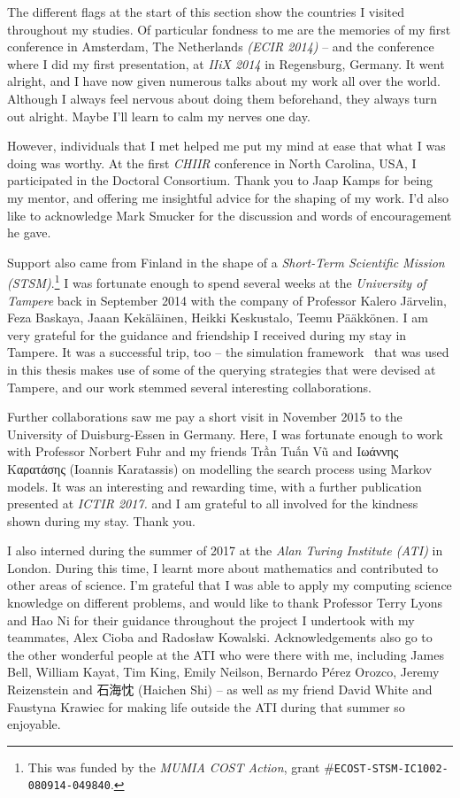 \begin{preamble}
The different flags at the start of this section show the countries I visited throughout my studies. Of particular fondness to me are the memories of my first conference in Amsterdam, The Netherlands \emph{(ECIR 2014)} -- and the conference where I did my first presentation, at \emph{IIiX 2014} in Regensburg, Germany. It went alright, and I have now given numerous talks about my work all over the world. Although I always feel nervous about doing them beforehand, they always turn out alright. Maybe I'll learn to calm my nerves one day.

However, individuals that I met helped me put my mind at ease that what I was doing was worthy. At the first \emph{CHIIR} conference in North Carolina, USA, I participated in the Doctoral Consortium. Thank you to Jaap Kamps for being my mentor, and offering me insightful advice for the shaping of my work. I'd also like to acknowledge Mark Smucker for the discussion and words of encouragement he gave.

Support also came from Finland in the shape of a \emph{Short-Term Scientific Mission (STSM)}.\footnote{This was funded by the \emph{MUMIA COST Action}, grant \#\texttt{ECOST-STSM-IC1002-080914-049840}.} I was fortunate enough to spend several weeks at the \emph{University of Tampere} back in September 2014 with the company of Professor Kalero J\"{a}rvelin, Feza Baskaya, Jaaan Kek\"{a}l\"{a}inen, Heikki Keskustalo, Teemu P\"{a}\"{a}kk\"{o}nen. I am very grateful for the guidance and friendship I received during my stay in Tampere. It was a successful trip, too -- the simulation framework \simiir~that was used in this thesis makes use of some of the querying strategies that were devised at Tampere, and our work stemmed several interesting collaborations.

Further collaborations saw me pay a short visit in November 2015 to the University of Duisburg-Essen in Germany. Here, I was fortunate enough to work with Professor Norbert Fuhr and my friends Trần Tuấn Vũ and Ιωάννης Καρατάσης (Ioannis Karatassis) on modelling the search process using Markov models. It was an interesting and rewarding time, with a further publication presented at \emph{ICTIR 2017.} and I am grateful to all involved for the kindness shown during my stay. Thank you.

I also interned during the summer of 2017 at the \emph{Alan Turing Institute (ATI)} in London. During this time, I learnt more about mathematics and contributed to other areas of science. I'm grateful that I was able to apply my computing science knowledge on different problems, and would like to thank Professor Terry Lyons and Hao Ni for their guidance throughout the project I undertook with my teammates, Alex Cioba and Rados\l{}aw Kowalski. Acknowledgements also go to the other wonderful people at the ATI who were there with me, including James Bell, William Kayat, Tim King, Emily Neilson, Bernardo P\'{e}rez Orozco, Jeremy Reizenstein and {\asianfont 石海忱} (Haichen Shi) -- as well as my friend David White and Faustyna Krawiec for making life outside the ATI during that summer so enjoyable.


\end{preamble}
